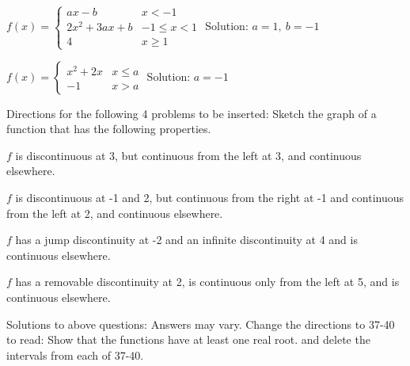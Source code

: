 \documentclass[10pt]{article}
\newcommand{\ds}{\displaystyle}
\begin{document}
$\ds f(x)=\begin{cases}
ax-b & x<-1\\
2x^2+3ax+b &-1\leq x<1\\
4&x\geq 1 \end{cases}$				Solution: $a=1, \ b=-1$

$\ds f(x)=\begin{cases}
x^2+2x & x\leq a\\
-1 & x>a 
\end{cases}$					Solution: $a=-1$

Directions for the following 4 problems to be inserted:  Sketch the graph of a function that has the following properties.

$f$ is discontinuous at 3, but continuous from the left at 3, and continuous elsewhere.

$f$ is discontinuous at -1 and 2, but continuous from the right at -1 and continuous from the left at 2, and continuous elsewhere.

$f$ has a jump discontinuity at -2 and an infinite discontinuity at 4 and is continuous elsewhere.

$f$ has a removable discontinuity at 2, is continuous only from the left at 5, and is continuous elsewhere.

Solutions to above questions:  Answers may vary.
Change the directions to 37-40 to read: Show that the functions have at least one real root. 
 and delete the intervals from each of 37-40.
\end{document}
